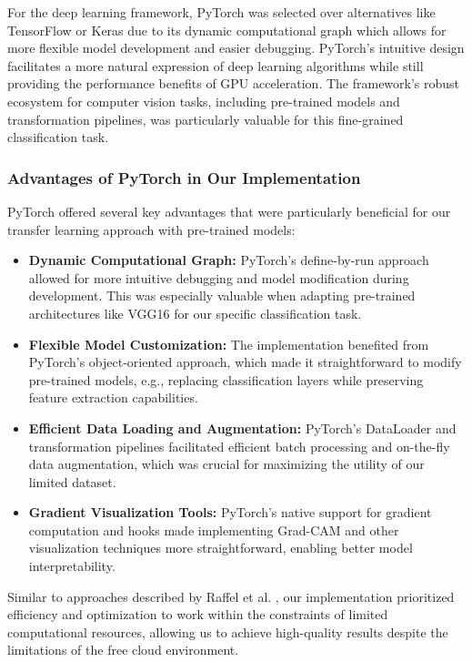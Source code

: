 For the deep learning framework, PyTorch was selected over alternatives like TensorFlow or Keras due to its dynamic computational graph which allows for more flexible model development and easier debugging. PyTorch's intuitive design facilitates a more natural expression of deep learning algorithms while still providing the performance benefits of GPU acceleration. The framework's robust ecosystem for computer vision tasks, including pre-trained models and transformation pipelines, was particularly valuable for this fine-grained classification task.

\subsubsection{Advantages of PyTorch in Our Implementation}

PyTorch offered several key advantages that were particularly beneficial for our transfer learning approach with pre-trained models:

\begin{itemize}
    \item \textbf{Dynamic Computational Graph:} PyTorch's define-by-run approach allowed for more intuitive debugging and model modification during development. This was especially valuable when adapting pre-trained architectures like VGG16 for our specific classification task.

    \item \textbf{Flexible Model Customization:} The implementation benefited from PyTorch's object-oriented approach, which made it straightforward to modify pre-trained models, e.g., replacing classification layers while preserving feature extraction capabilities.

    \item \textbf{Efficient Data Loading and Augmentation:} PyTorch's DataLoader and transformation pipelines facilitated efficient batch processing and on-the-fly data augmentation, which was crucial for maximizing the utility of our limited dataset.

    \item \textbf{Gradient Visualization Tools:} PyTorch's native support for gradient computation and hooks made implementing Grad-CAM and other visualization techniques more straightforward, enabling better model interpretability.
\end{itemize}

Similar to approaches described by Raffel et al. \citep{raffel2023}, our implementation prioritized efficiency and optimization to work within the constraints of limited computational resources, allowing us to achieve high-quality results despite the limitations of the free cloud environment.

